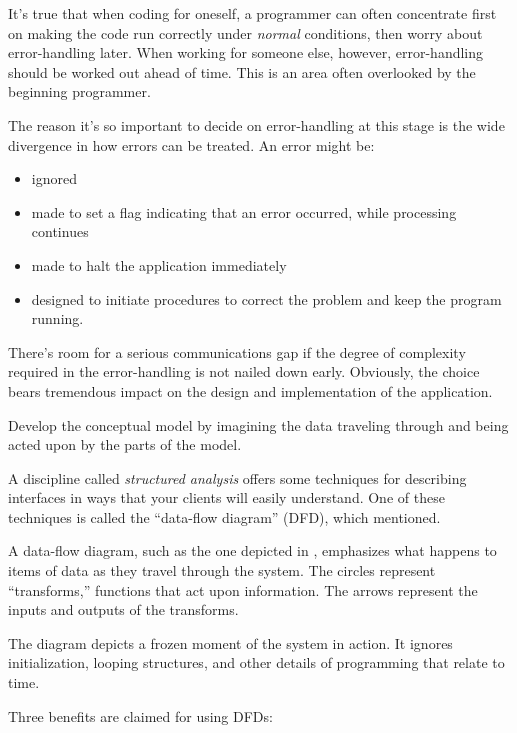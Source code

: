 \noindent It's true that when coding for oneself, a programmer can
often concentrate first on making the code run correctly under
\emph{normal} conditions, then worry about error-handling later. When
working for someone else, however, error-handling should be worked out
ahead of time. This is an area often overlooked by the beginning
programmer.

The reason it's so important to decide on error-handling at this stage
is the wide divergence in how errors can be treated. An error might be:

\begin{itemize}
\item ignored
\item made to set a flag indicating that an error occurred, while
processing continues
\item made to halt the application immediately
\item designed to initiate procedures to correct the problem and keep
the program running.
\end{itemize}
%
%
There's room for a serious communications gap if the degree of
complexity required in the error-handling is not nailed down early.
Obviously, the choice bears tremendous impact on the design and
implementation of the application.%

\begin{tip}
Develop the conceptual model by imagining the data traveling through and
being acted upon by the parts of the model.
\end{tip}%
A discipline called \emph{structured analysis} \cite{weinberg80}
offers some techniques for describing interfaces in ways that your
clients will easily understand.  One of these techniques is called the
``data-flow diagram'' (DFD), which  mentioned.


A data-flow diagram, such as the one depicted in ,
emphasizes what happens to items of data as they travel through the
system.  The circles represent ``transforms,'' functions that act upon
information.  The arrows represent the inputs and outputs of the
transforms.

The diagram depicts a frozen moment of the system in action. It
ignores initialization, looping structures, and other details of
programming that relate to time.

Three benefits are claimed for using DFDs:

